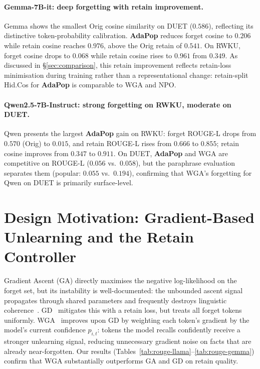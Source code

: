\paragraph{Gemma-7B-it: deep forgetting with retain improvement.}
Gemma shows the smallest Orig cosine similarity on DUET ($0.586$), reflecting its distinctive token-probability calibration. \textbf{AdaPop} reduces forget cosine to $0.206$ while retain cosine reaches $0.976$, above the Orig retain of $0.541$. On RWKU, forget cosine drops to $0.068$ while retain cosine rises to $0.961$ from $0.349$. As discussed in \S\ref{sec:comparison}, this retain improvement reflects retain-loss minimisation during training rather than a representational change: retain-split Hid.Cos for \textbf{AdaPop} is comparable to WGA and NPO.

\paragraph{Qwen2.5-7B-Instruct: strong forgetting on RWKU, moderate on DUET.}
Qwen presents the largest \textbf{AdaPop} gain on RWKU: forget ROUGE-L drops from $0.570$ (Orig) to $0.015$, and retain ROUGE-L rises from $0.666$ to $0.855$; retain cosine improves from $0.347$ to $0.911$. On DUET, \textbf{AdaPop} and WGA are competitive on ROUGE-L ($0.056$ vs.\ $0.058$), but the paraphrase evaluation separates them (popular: $0.055$ vs.\ $0.194$), confirming that WGA's forgetting for Qwen on DUET is primarily surface-level.

\section{Design Motivation: Gradient-Based Unlearning and the Retain Controller}
\label{app:design_motivation}

Gradient Ascent (GA) directly maximises the negative log-likelihood on the forget set, but its instability is well-documented: the unbounded ascent signal propagates through shared parameters and frequently destroys linguistic coherence~\cite{zhang2024negative, yao2024large}. GD~\cite{liu2022continual} mitigates this with a retain loss, but treats all forget tokens uniformly. WGA~\cite{wang2025rethinking} improves upon GD by weighting each token's gradient by the model's current confidence $p_{i,t}$: tokens the model recalls confidently receive a stronger unlearning signal, reducing unnecessary gradient noise on facts that are already near-forgotten. Our results (Tables~\ref{tab:rouge-llama}--\ref{tab:rouge-gemma}) confirm that WGA substantially outperforms GA and GD on retain quality.

